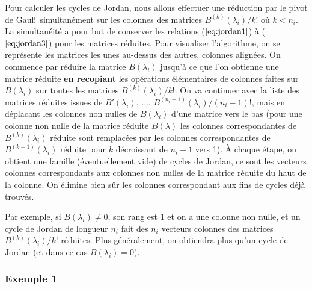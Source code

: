 \documentclass[a4paper,11pt]{article}
\begin{document}
\begin{giacjshere}
Pour calculer les cycles de Jordan, nous allons effectuer une
r\'eduction par le pivot de Gau\ss\ simultan\'ement sur les colonnes
des matrices $B^{(k)}(\lambda _i)/k!$ o\`u $k<n_i$. 
La simultan\'eit\'e a pour but de conserver les
relations (\(\ref{eq:jordan1}\)) \`a (\(\ref{eq:jordan3}\)) pour les matrices
r\'eduites. Pour visualiser l'algorithme, on se repr\'esente les
matrices les unes au-dessus des autres, colonnes align\'ees.
On commence par r\'eduire la matrice $B(\lambda _i)$ jusqu'\`a ce
que l'on obtienne une matrice r\'eduite {\bf en recopiant} les op\'erations
\'el\'ementaires de colonnes faites sur $B(\lambda _i)$ sur toutes les matrices
$B^{(k)}(\lambda _i)/k!$. On va continuer avec la liste des matrices
r\'eduites issues de $B'(\lambda _i)$, ..., 
$B^{(n_i-1)}(\lambda _i)/(n_i-1)!$, 
mais en d\'eplacant les colonnes non nulles de $B(\lambda _i)$ 
d'une matrice vers le bas
(pour une colonne non nulle de la matrice r\'eduite $B(\lambda )$
les colonnes correspondantes de $B^{(k)}(\lambda _i)$ r\'eduite 
sont remplac\'ees par les colonnes correspondantes de $B^{(k-1)}(\lambda _i)$
r\'eduite pour $k$ d\'ecroissant de $n_i-1$ vers 1).
\`A chaque \'etape, on obtient une famille (\'eventuellement vide)
de cycles de Jordan, ce sont les vecteurs colonnes correspondants 
aux colonnes non nulles de la matrice r\'eduite du haut de la colonne.
On \'elimine bien s\^ur les colonnes correspondant aux fins de cycles
d\'ej\`a trouv\'es.

Par exemple, si $B(\lambda _i)\neq 0$, son rang est 1 et on a
une colonne non nulle, et un cycle de Jordan de longueur
$n_i$ fait des $n_i$ vecteurs colonnes des matrices
$B^{(k)}(\lambda _i)/k!$ r\'eduites. 
Plus g\'en\'eralement, on obtiendra plus qu'un cycle de Jordan
(et dans ce cas $B(\lambda _i)= 0$).


\subsubsection{Exemple 1} \label{sec:ex1}


\end{giacjshere}
\end{document}
